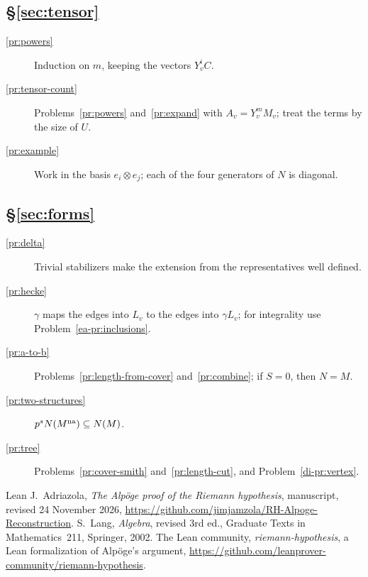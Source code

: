 \documentclass[reqno]{amsart}
\theoremstyle{definition}
\theoremstyle{plain}
\theoremstyle{remark}
\begin{document}
\subsection*{\S\ref{sec:tensor}}
\begin{description}
\item[\ref{pr:powers}] Induction on \(m\), keeping the vectors \(Y_v^iC\).
\item[\ref{pr:tensor-count}] Problems~\ref{pr:powers} and~\ref{pr:expand} with \(A_v=Y_v^mM_v\); treat the terms by the size of \(U\).
\item[\ref{pr:example}] Work in the basis \(e_i\otimes e_j\); each of the four generators of \(N\) is diagonal.
\end{description}

\subsection*{\S\ref{sec:forms}}
\begin{description}
\item[\ref{pr:delta}] Trivial stabilizers make the extension from the representatives well defined.
\item[\ref{pr:hecke}] \(\gamma\) maps the edges into \(L_v\) to the edges into \(\gamma L_v\); for integrality use Problem~\ref{ea-pr:inclusions}.
\item[\ref{pr:a-to-b}] Problems~\ref{pr:length-from-cover} and~\ref{pr:combine}; if \(S=0\), then \(N=M\).
\item[\ref{pr:two-structures}] \(p^sN(M^{\rm na})\subseteq N(M)\).
\item[\ref{pr:tree}] Problems~\ref{pr:cover-smith} and~\ref{pr:length-cut}, and Problem~\ref{di-pr:vertex}.
\end{description}

\begin{thebibliography}{Lean}
  J.~Adriazola, \emph{The Alp\"oge proof of the Riemann hypothesis}, manuscript, revised 24 November 2026, \url{https://github.com/jimjamzola/RH-Alpoge-Reconstruction}.
  S.~Lang, \emph{Algebra}, revised 3rd ed., Graduate Texts in Mathematics~211, Springer, 2002.
 The Lean community, \emph{riemann-hypothesis}, a Lean formalization of Alp\"oge's argument, \url{https://github.com/leanprover-community/riemann-hypothesis}.
\end{thebibliography}
\end{document}
